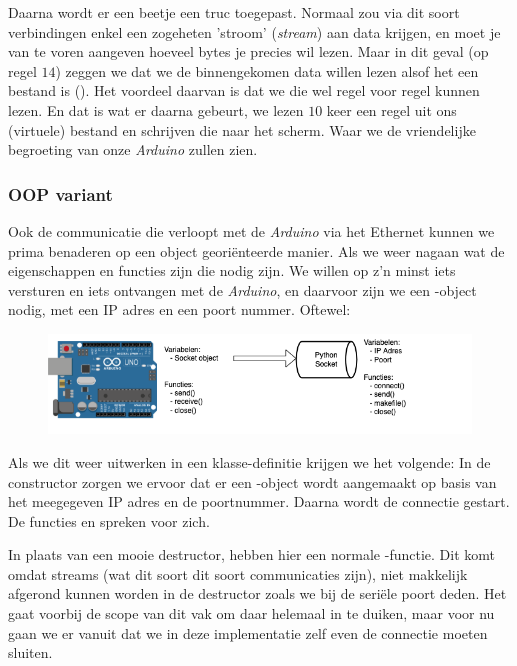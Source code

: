 Daarna wordt er een beetje een truc toegepast. Normaal zou via dit soort verbindingen enkel een zogeheten 'stroom' (\textit{stream}) aan data krijgen, en moet je van te voren aangeven hoeveel bytes je precies wil lezen. Maar in dit geval (op regel $14$) zeggen we dat we de binnengekomen data willen lezen alsof het een bestand is (). Het voordeel daarvan is dat we die wel regel voor regel kunnen lezen. 
En dat is wat er daarna gebeurt, we lezen $10$ keer een regel uit ons (virtuele) bestand  en schrijven die naar het scherm. Waar we de vriendelijke begroeting van onze \textit{Arduino} zullen zien. 

\subsubsection{OOP variant}
Ook de communicatie die verloopt met de \textit{Arduino} via het Ethernet kunnen we prima benaderen op een object georiënteerde manier. Als we weer nagaan wat de eigenschappen en functies zijn die nodig zijn. We willen op z'n minst iets versturen en iets ontvangen met de \textit{Arduino}, en daarvoor zijn we een -object nodig, met een IP adres en een poort nummer. Oftewel:

\begin{figure}[h!]
\centering\includegraphics[scale=0.6]{Pictures/chapter08/socket_oop.png}
\label{fig:socket_oop} %
\end{figure}

Als we dit weer uitwerken in een klasse-definitie krijgen we het volgende:
In de constructor zorgen we ervoor dat er een -object wordt aangemaakt op basis van het meegegeven IP adres en de poortnummer. Daarna wordt de connectie gestart. De functies  en  spreken voor zich. 

In plaats van een mooie destructor, hebben hier een normale -functie. Dit komt omdat streams (wat dit soort dit soort communicaties zijn), niet makkelijk afgerond kunnen worden in de destructor zoals we bij de seriële poort deden. Het gaat voorbij de scope van dit vak om daar helemaal in te duiken, maar voor nu gaan we er vanuit dat we in deze implementatie zelf even de connectie moeten sluiten. 

